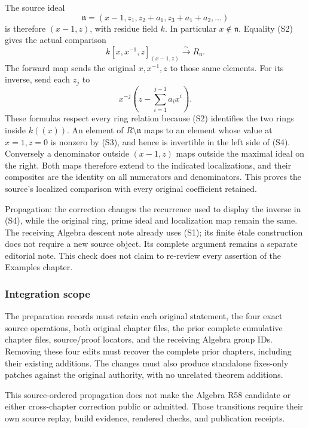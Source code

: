 The source ideal \[
 \mathfrak n=(x-1,z_1,z_2+a_1,z_3+a_1+a_2,\ldots)
\] is therefore \((x-1,z)\), with residue field \(k\). In particular \(x\notin\mathfrak n\). Equality (S2) gives the actual comparison \[
 k[x,x^{-1},z]_{(x-1,z)}
 \xrightarrow{\sim} R_{\mathfrak n}.
\tag{S4}
\] The forward map sends the original \(x,x^{-1},z\) to those same elements. For its inverse, send each \(z_j\) to \[
 x^{-j}\left(z-\sum_{i=1}^{j-1}a_i x^i\right).
\] These formulas respect every ring relation because (S2) identifies the two rings inside \(k((x))\). An element of \(R\setminus\mathfrak n\) maps to an element whose value at \(x=1,z=0\) is nonzero by (S3), and hence is invertible in the left side of (S4). Conversely a denominator outside \((x-1,z)\) maps outside the maximal ideal on the right. Both maps therefore extend to the indicated localizations, and their composites are the identity on all numerators and denominators. This proves the source's localized comparison with every original coefficient retained.

Propagation: the correction changes the recurrence used to display the inverse in (S4), while the original ring, prime ideal and localization map remain the same. The receiving Algebra descent note already uses (S1); its finite étale construction does not require a new source object. Its complete argument remains a separate editorial note. This check does not claim to re-review every assertion of the Examples chapter.

\subsubsection{Integration scope}\label{integration-scope}

The preparation records must retain each original statement, the four exact source operations, both original chapter files, the prior complete cumulative chapter files, source/proof locators, and the receiving Algebra group IDs. Removing these four edits must recover the complete prior chapters, including their existing additions. The changes must also produce standalone fixes-only patches against the original authority, with no unrelated theorem additions.

This source-ordered propagation does not make the Algebra R58 candidate or either cross-chapter correction public or admitted. Those transitions require their own source replay, build evidence, rendered checks, and publication receipts.
